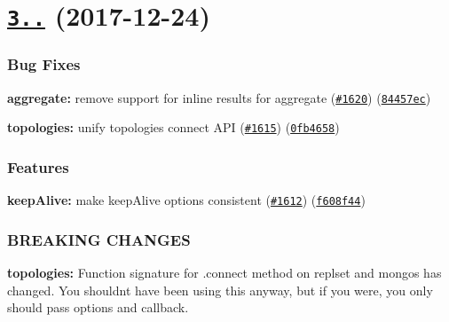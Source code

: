 \label{_3.0.0}%
 \section*{\href{https://github.com/mongodb/node-mongodb-native/compare/v3.0.0-rc0...v3.0.0}{\tt 3..} (2017-\/12-\/24)}

\subsubsection*{Bug Fixes}


\begin{DoxyItemize}
\item {\bfseries aggregate\+:} remove support for inline results for aggregate (\href{https://github.com/mongodb/node-mongodb-native/issues/1620}{\tt \#1620}) (\href{https://github.com/mongodb/node-mongodb-native/commit/84457ec}{\tt 84457ec})
\item {\bfseries topologies\+:} unify topologies connect A\+PI (\href{https://github.com/mongodb/node-mongodb-native/issues/1615}{\tt \#1615}) (\href{https://github.com/mongodb/node-mongodb-native/commit/0fb4658}{\tt 0fb4658})
\end{DoxyItemize}

\subsubsection*{Features}


\begin{DoxyItemize}
\item {\bfseries keep\+Alive\+:} make keep\+Alive options consistent (\href{https://github.com/mongodb/node-mongodb-native/issues/1612}{\tt \#1612}) (\href{https://github.com/mongodb/node-mongodb-native/commit/f608f44}{\tt f608f44})
\end{DoxyItemize}

\subsubsection*{B\+R\+E\+A\+K\+I\+NG C\+H\+A\+N\+G\+ES}


\begin{DoxyItemize}
\item {\bfseries topologies\+:} Function signature for {\ttfamily .connect} method on replset and mongos has changed. You shouldn\textquotesingle{}t have been using this anyway, but if you were, you only should pass {\ttfamily options} and {\ttfamily callback}.
\end{DoxyItemize}

